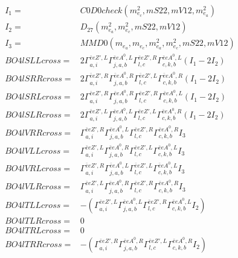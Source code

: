 \documentclass[A4,landscape]{article}
\begin{document}
\begin{align} 
I_1 = & C0D0check(m^2_{e_{{c}}}, mS22, mV12, m^2_{e_{{a}}}) \\ 
I_2 = & D_{27}(m^2_{e_{{a}}}, m^2_{e_{{c}}}, mS22, mV12) \\ 
I_3 = & MMD0(m_{e_{{a}}}, m_{e_{{c}}}, m^2_{e_{{a}}}, m^2_{e_{{c}}}, mS22, mV12) \\ 
  BO4lSLLcross= & 2  \Gamma^{\bar{e}e {Z'} ,L}_{a, i} \Gamma^{\bar{e}e A^0 ,L}_{j, a, b} \Gamma^{\bar{e}e {Z'} ,R}_{l, c} \Gamma^{\bar{e}e A^0 ,L}_{c, k, b} (I_1 - 2 I_2) \\ 
  BO4lSRRcross= & 2  \Gamma^{\bar{e}e {Z'} ,R}_{a, i} \Gamma^{\bar{e}e A^0 ,R}_{j, a, b} \Gamma^{\bar{e}e {Z'} ,L}_{l, c} \Gamma^{\bar{e}e A^0 ,R}_{c, k, b} (I_1 - 2 I_2) \\ 
  BO4lSRLcross= & 2  \Gamma^{\bar{e}e {Z'} ,R}_{a, i} \Gamma^{\bar{e}e A^0 ,R}_{j, a, b} \Gamma^{\bar{e}e {Z'} ,R}_{l, c} \Gamma^{\bar{e}e A^0 ,L}_{c, k, b} (I_1 - 2 I_2) \\ 
  BO4lSLRcross= & 2  \Gamma^{\bar{e}e {Z'} ,L}_{a, i} \Gamma^{\bar{e}e A^0 ,L}_{j, a, b} \Gamma^{\bar{e}e {Z'} ,L}_{l, c} \Gamma^{\bar{e}e A^0 ,R}_{c, k, b} (I_1 - 2 I_2) \\ 
  BO4lVRRcross= &  \Gamma^{\bar{e}e {Z'} ,R}_{a, i} \Gamma^{\bar{e}e A^0 ,L}_{j, a, b} \Gamma^{\bar{e}e {Z'} ,R}_{l, c} \Gamma^{\bar{e}e A^0 ,R}_{c, k, b} I_3 \\ 
  BO4lVLLcross= &  \Gamma^{\bar{e}e {Z'} ,L}_{a, i} \Gamma^{\bar{e}e A^0 ,R}_{j, a, b} \Gamma^{\bar{e}e {Z'} ,L}_{l, c} \Gamma^{\bar{e}e A^0 ,L}_{c, k, b} I_3 \\ 
  BO4lVRLcross= &  \Gamma^{\bar{e}e {Z'} ,R}_{a, i} \Gamma^{\bar{e}e A^0 ,L}_{j, a, b} \Gamma^{\bar{e}e {Z'} ,L}_{l, c} \Gamma^{\bar{e}e A^0 ,L}_{c, k, b} I_3 \\ 
  BO4lVLRcross= &  \Gamma^{\bar{e}e {Z'} ,L}_{a, i} \Gamma^{\bar{e}e A^0 ,R}_{j, a, b} \Gamma^{\bar{e}e {Z'} ,R}_{l, c} \Gamma^{\bar{e}e A^0 ,R}_{c, k, b} I_3 \\ 
  BO4lTLLcross= & -( \Gamma^{\bar{e}e {Z'} ,L}_{a, i} \Gamma^{\bar{e}e A^0 ,L}_{j, a, b} \Gamma^{\bar{e}e {Z'} ,R}_{l, c} \Gamma^{\bar{e}e A^0 ,L}_{c, k, b} I_2) \\ 
  BO4lTLRcross= & 0 \\ 
  BO4lTRLcross= & 0 \\ 
  BO4lTRRcross= & -( \Gamma^{\bar{e}e {Z'} ,R}_{a, i} \Gamma^{\bar{e}e A^0 ,R}_{j, a, b} \Gamma^{\bar{e}e {Z'} ,L}_{l, c} \Gamma^{\bar{e}e A^0 ,R}_{c, k, b} I_2) \\ 
\end{align} 
\end{document}
